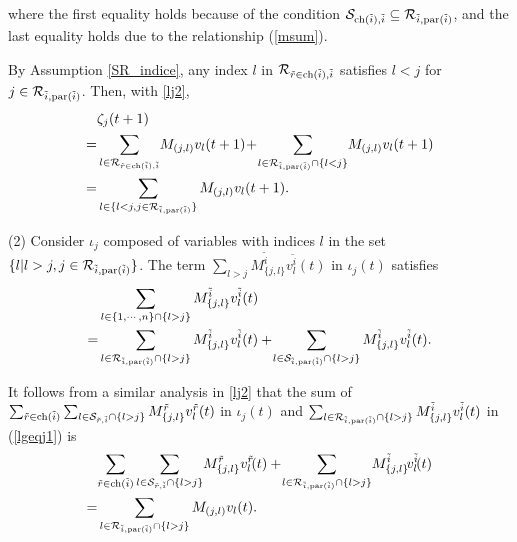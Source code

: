 \documentclass[journal]{IEEEtran}
\begin{document}
where the first equality holds because of the condition $\mathcal{S}_{{\rm ch}(\tilde{i}),\tilde{i}}\subseteq \mathcal{R}_{\tilde{i},{\rm par}(\tilde{i})}$, and the last equality holds due to the relationship (\ref{msum}).
\par By Assumption \ref{SR_indice}, any index $l$ in $\mathcal{R}_{\tilde{r}\in {\rm ch}(\tilde{i}),\tilde{i}}$ satisfies $l<j$ for $j\in \mathcal{R}_{\tilde{i},{\rm par}(\tilde{i})}$. Then, with \eqref{lj2}, 
\begin{align}\label{lleqj}
&\zeta_j(t+1)\notag \\
=&\sum_{l\in \mathcal{R}_{\tilde{r}\in {\rm ch}(\tilde{i}),\tilde{i}}}\! M_{(j,l)} v_{l}(t+1)\!+\!\sum_{l\in \mathcal{R}_{\tilde{i},{\rm par}(\tilde{i})}\cap\{l<j\}} \! M_{(j,l)}v_l(t+1)\notag\\
=&\sum_{l\in \{l<j,j\in \mathcal{R}_{\tilde{i},{\rm par}(\tilde{i})}\}} M_{(j,l)}v_l(t+1).
\end{align}
\par (2) Consider $\iota_j$ composed of variables with indices $l$ in the set $\{l|l>j,j\in \mathcal{R}_{\tilde{i},{\rm par}(\tilde{i})}\}$. The term $\sum_{l>j} M^{\tilde{i}}_{\{j,l\}} {v}_l^{\tilde{i}}(t)$ in $\iota_j(t)$ satisfies
\begin{align}\label{lgeqj1}
&\sum_{l\in \{1,\cdots,n\}\cap\{l>j\}} M^{\tilde{i}}_{\{j,l\}} {v}_l^{\tilde{i}}(t)\notag \\
=&\sum_{l\in \mathcal{R}_{\tilde{i},{\rm par}(\tilde{i})}\cap \{l>j\}} M_{\{j,l\}}^{\tilde{i}} v_{l}^{\tilde{i}}(t)+\!\sum_{l\in \mathcal{S}_{\tilde{i},{\rm par}(\tilde{i})}\cap \{l>j\}} M_{\{j,l\}}^{\tilde{i}} v_{l}^{\tilde{i}}(t).
\end{align}
\par It follows from a similar analysis in \eqref{lj2} that the sum of $\sum_{\tilde{r}\in {\rm ch}(\tilde{i})}\sum_{l\in \mathcal{S}_{\tilde{r},\tilde{i}}\cap \{l>j\}} M_{\{j,l\}}^{\tilde{r}} v_{l}^{\tilde{r}}(t)$ in $\iota_j(t)$ and $\sum_{l\in \mathcal{R}_{\tilde{i},{\rm par}(\tilde{i})}\cap \{l>j\}} M_{\{j,l\}}^{\tilde{i}} v_{l}^{\tilde{i}}(t)$ in (\ref{lgeqj1}) is
\begin{align}\label{Rlgeqj}
&\!\sum_{\tilde{r}\in {\rm ch}(\tilde{i})}\sum_{l\in \mathcal{S}_{\tilde{r},\tilde{i}}\cap \{l>j\}}\! M_{\{j,l\}}^{\tilde{r}}  v_{l}^{\tilde{r}}\!(t)+\!\sum_{l\in \mathcal{R}_{\tilde{i},{\rm par}(\tilde{i})}\cap \{l>j\}}\! M_{\{j,l\}}^{\tilde{i}} \!v_{l}^{\tilde{i}}\!(t)\notag\\
=&\sum_{l\in  \mathcal{R}_{\tilde{i},{\rm par}(\tilde{i})} \cap \{l>j\}} M_{(j,l)}v_l(t).
\end{align}
\end{document}
